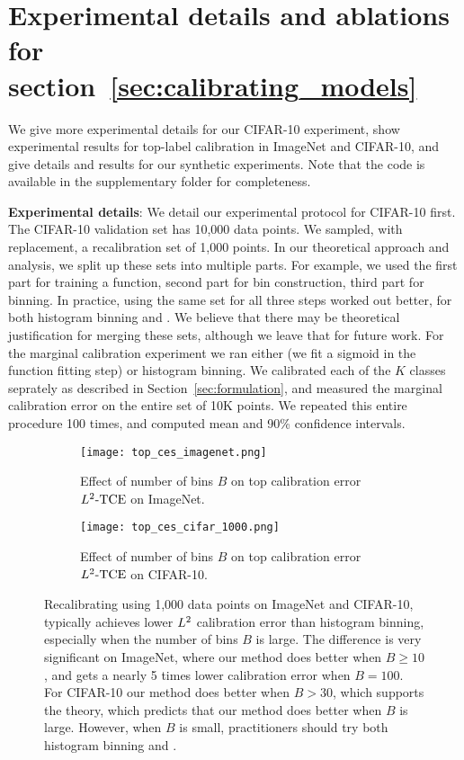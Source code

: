 
\section{Experimental details and ablations for section~\ref{sec:calibrating_models}}

\label{sec:calibrating_models_appendix_experiments}

We give more experimental details for our CIFAR-10 experiment, show experimental results for top-label calibration in ImageNet and CIFAR-10, and give details and results for our synthetic experiments. Note that the code is available in the supplementary folder for completeness.

\textbf{Experimental details}: We detail our experimental protocol for CIFAR-10 first. The CIFAR-10 validation set has 10,000 data points. We sampled, with replacement, a recalibration set of 1,000 points. In our theoretical approach and analysis, we split up these sets into multiple parts. For example, we used the first part for training a function, second part for bin construction, third part for binning. In practice, using the same set for all three steps worked out better, for both histogram binning and \ourcal{}. We believe that there may be theoretical justification for merging these sets, although we leave that for future work. For the marginal calibration experiment we ran either \ourcal{} (we fit a sigmoid in the function fitting step) or histogram binning. We calibrated each of the $K$ classes seprately as described in Section~\ref{sec:formulation}, and measured the marginal calibration error on the entire set of 10K points. We repeated this entire procedure 100 times, and computed mean and 90\% confidence intervals.

\begin{figure}
  \centering
  \centering
  	 \begin{subfigure}[b]{0.48\textwidth}
         \centering
         \texttt{[image: top\_ces\_imagenet.png]}
         \caption{Effect of number of bins $B$ on top calibration error $L^2\textup{-TCE}$ on ImageNet.
         }
         \label{fig:imagenet_top_cal_var_red}
     \end{subfigure}
     \hfill
     \begin{subfigure}[b]{0.48\textwidth}
         \centering
         \texttt{[image: top\_ces\_cifar\_1000.png]}
         \caption{Effect of number of bins $B$ on top calibration error $L^2\textup{-TCE}$ on CIFAR-10.
         }
         \label{fig:cifar_top_cal_var_red}
     \end{subfigure}
  \caption{
    Recalibrating using 1,000 data points on ImageNet and CIFAR-10, \ourcal{} typically achieves lower $L^2$ calibration error than histogram binning, especially when the number of bins $B$ is large. The difference is very significant on ImageNet, where our method does better when $B \geq 10$, and gets a nearly 5 times lower calibration error when $B = 100$. For CIFAR-10 our method does better when $B > 30$, which supports the theory, which predicts that our method does better when $B$ is large. However, when $B$ is small, practitioners should try both histogram binning and \ourcal{}.
}
  \label{fig:mse_estimators_bins}
\end{figure}

